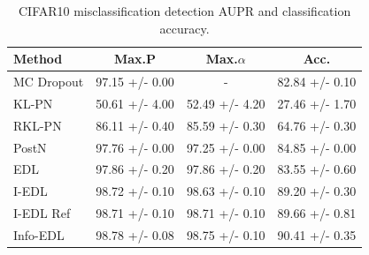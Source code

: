 \begin{table}[t]
\centering
\caption{CIFAR10 misclassification detection AUPR and classification accuracy.}
\small
\begin{tabular}{lccc}
\toprule
Method & Max.P & Max.$\alpha$ & Acc. \\
\midrule
MC Dropout & 97.15 +/- 0.00 & - & 82.84 +/- 0.10 \\
KL-PN & 50.61 +/- 4.00 & 52.49 +/- 4.20 & 27.46 +/- 1.70 \\
RKL-PN & 86.11 +/- 0.40 & 85.59 +/- 0.30 & 64.76 +/- 0.30 \\
PostN & 97.76 +/- 0.00 & 97.25 +/- 0.00 & 84.85 +/- 0.00 \\
EDL & 97.86 +/- 0.20 & 97.86 +/- 0.20 & 83.55 +/- 0.60 \\
I-EDL & 98.72 +/- 0.10 & 98.63 +/- 0.10 & 89.20 +/- 0.30 \\
I-EDL Ref & 98.71 +/- 0.10 & 98.71 +/- 0.10 & 89.66 +/- 0.81 \\
Info-EDL & 98.78 +/- 0.08 & 98.75 +/- 0.10 & 90.41 +/- 0.35 \\
\bottomrule
\end{tabular}
\end{table}
